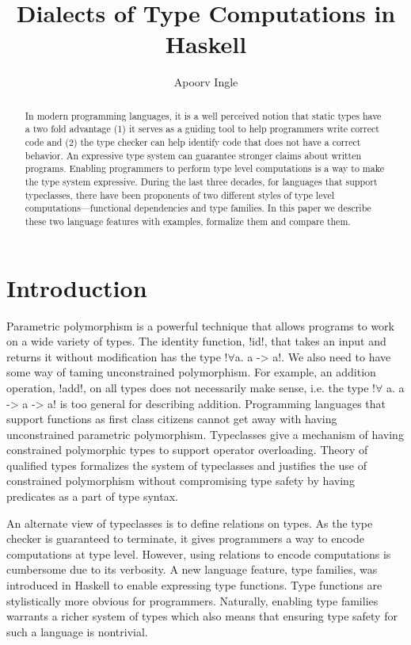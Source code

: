 \documentclass[format=acmsmall,manuscript,review,screen,nonacm,margin=1in,11pt]{acmart}
\title{Dialects of Type Computations in Haskell}
\author{Apoorv Ingle}
\affiliation{%
  \institution{University of Iowa}
  \department{Department of Computer Science}
  \streetaddress{McLean Hall}
  \city{Iowa City}
  \state{Iowa}
  \country{USA}}
\begin{document}
\begin{abstract}
In modern programming languages, it is a well perceived notion
that static types have a two fold advantage (1) it serves as a guiding tool to help programmers
write correct code and (2) the type checker can help identify
code that does not have a correct behavior. An expressive type system
can guarantee stronger claims about written programs. Enabling programmers to perform
type level computations is a way to make the type system expressive.
During the last three decades, for languages that support typeclasses, there have been proponents
of two different styles of type level computations---functional dependencies and type families.
In this paper we describe these two language features with examples, formalize them and compare them.
\end{abstract}
\maketitle
\vspace{-1.25em}
\section{Introduction}
Parametric polymorphism is a powerful technique that allows programs to work on
a wide variety of types. The identity function, !id!, that takes an input and returns it
without modification has the type !$\forall$a. a -> a!.
We also need to have some way of taming unconstrained polymorphism.
For example, an addition operation, !add!, on all types does not necessarily make sense,
i.e. the type !$\forall$ a. a -> a -> a! is too general for describing addition.
Programming languages that support functions as first class citizens
cannot get away with having unconstrained parametric polymorphism.
Typeclasses\cite{wadler_polymorphism_1989} give a mechanism
of having constrained polymorphic types to support operator overloading.
Theory of qualified types\cite{jones_qualified_1994} formalizes the
system of typeclasses and justifies the use of constrained polymorphism
without compromising type safety by having predicates as a part of type syntax.

An alternate view of typeclasses is to define relations on types. As the
type checker is guaranteed to terminate, it gives programmers a way to
encode computations at type level.
However, using relations to encode computations is cumbersome due to its verbosity.
A new language feature, type families\cite{schrijvers_towards_2007}, was introduced in Haskell
to enable expressing type functions. Type functions are stylistically
more obvious for programmers. Naturally, enabling type families warrants a richer system of types
which also means that ensuring type safety for such a language is nontrivial.
\end{document}
